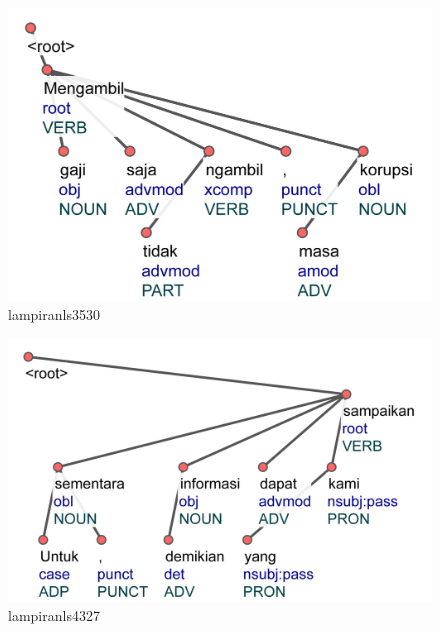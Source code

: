 \begin{figure}
	\centering \includegraphics[width=0.8
	\textwidth] {pics/lampiran/lampiranls3530.jpg} 
	\caption{lampiranls3530} 
	\label{fig:lampiranls3530} 
\end{figure}

\begin{figure}
	\centering \includegraphics[width=0.8
	\textwidth] {pics/lampiran/lampiranls4327.jpg} 
	\caption{lampiranls4327} 
	\label{fig:lampiranls4327} 
\end{figure}

